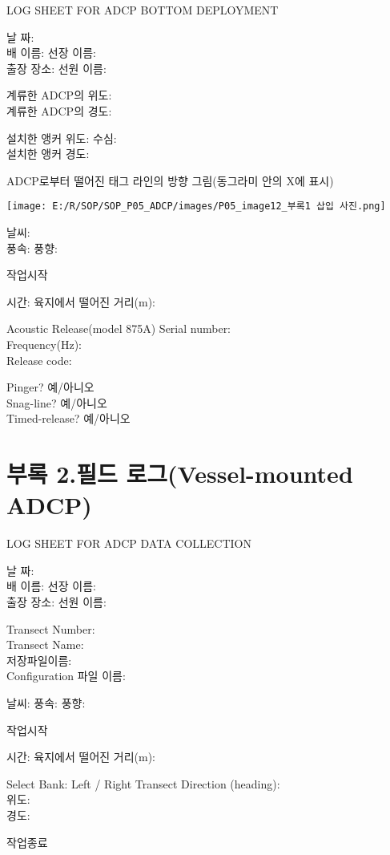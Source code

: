 \documentclass[
]{book}
\begin{document}
LOG SHEET FOR ADCP BOTTOM DEPLOYMENT

날 짜:\\
배 이름: 선장 이름:\\
출장 장소: 선원 이름:

계류한 ADCP의 위도:\\
계류한 ADCP의 경도:

설치한 앵커 위도: 수심:\\
설치한 앵커 경도:

ADCP로부터 떨어진 태그 라인의 방향 그림(동그라미 안의 X에 표시)

\texttt{[image: E:/R/SOP/SOP\_P05\_ADCP/images/P05\_image12\_부록1 삽입 사진.png]}

날씨:\\
풍속: 풍향:

작업시작

시간: 육지에서 떨어진 거리(m):

Acoustic Release(model 875A)
Serial number:\\
Frequency(Hz):\\
Release code:

Pinger? 예/아니오\\
Snag-line? 예/아니오\\
Timed-release? 예/아니오

\hypertarget{uxbd80uxb85d-2.uxd544uxb4dc-uxb85cuxadf8vessel-mounted-adcp}{%
\section{부록 2.필드 로그(Vessel-mounted ADCP)}\label{uxbd80uxb85d-2.uxd544uxb4dc-uxb85cuxadf8vessel-mounted-adcp}}

LOG SHEET FOR ADCP DATA COLLECTION

날 짜:\\
배 이름: 선장 이름:\\
출장 장소: 선원 이름:

Transect Number:\\
Transect Name:\\
저장파일이름:\\
Configuration 파일 이름:

날씨: 풍속: 풍향:

작업시작

시간: 육지에서 떨어진 거리(m):

Select Bank: Left / Right
Transect Direction (heading):\\
위도:\\
경도:

작업종료
\end{document}
